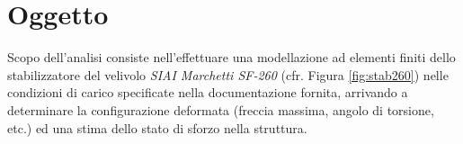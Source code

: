 \documentclass[
10pt, %
a4paper, %
oneside, %
headinclude,footinclude, %
BCOR5mm, %
]{scrartcl}
\title{\normalfont\spacedallcaps{Analisi Stabilizzatore SIAI MARCHETTI SF-260}} %
\author{\spacedlowsmallcaps{Claudio Caccia}} %
\date{\today} %
\begin{document}

\renewcommand{\sectionmark}[1]{\markright{\spacedlowsmallcaps{#1}}} %
\lehead{\mbox{\llap{\small\thepage\kern1em\color{halfgray} \vline}\color{halfgray}\hspace{0.5em}\rightmark\hfil}} %

\pagestyle{scrheadings} %


\maketitle %

\setcounter{tocdepth}{2} %

\tableofcontents %

\listoffigures %

\listoftables %


\section*{Oggetto} %

Scopo dell'analisi consiste nell'effettuare una modellazione ad elementi finiti dello stabilizzatore del velivolo \emph{SIAI Marchetti SF-260} (cfr. Figura \ref{fig:stab260}) nelle condizioni di carico specificate nella documentazione fornita, arrivando a determinare la configurazione deformata (freccia massima, angolo di torsione, etc.) ed una stima dello stato di sforzo nella struttura.
\end{document}
